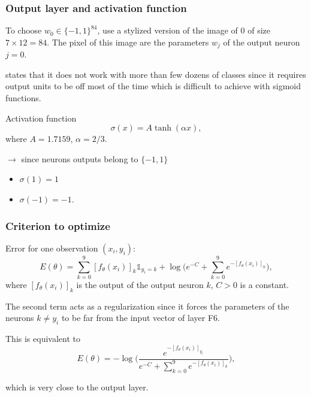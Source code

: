 \begin{frame}
	\frametitle{Output layer and activation function}
	
	To choose $w_0 \in \{-1, 1\}^{84}$, use a stylized version of the image of $0$ of size $7\times 12 =84$. The pixel of this image are the parameters $w_j$ of the output neuron $j=0$. 
	
	\medskip 
	
	\smallskip
	
	\cite{lecun1998gradient} states that it does not work with more than few dozens of classes since it requires output units to be off most of the time which is difficult to achieve with sigmoid functions. 
	
	\bigskip
	
	
	\begin{block}{Activation function}
	$$\sigma(x) = A \tanh (\alpha x),$$
	where $A = 1.7159$, $\alpha=2/3$. 
	\end{block}
	
	\smallskip 
	
	$\rightarrow$  since neurons outputs belong to $\{-1, 1\}$
	\begin{itemize}
		\item $\sigma(1) = 1$
		\item $\sigma(-1) = -1$.
	\end{itemize}
	
\end{frame}

\begin{frame}
	\frametitle{Criterion to optimize}
	
	Error for one observation $(x_i, y_i)$: 
	$$
	E (\theta) = \sum_{k=0}^{9}  [f_{\theta}(x_i)]_k \mathds{1}_{y_i = k}
	+ \log \Big(e^{-C} + \sum_{k=0}^9 e^{- [f_{\theta}(x_i)]_k} \Big),
	$$
	where $[f_{\theta}(x_i)]_k$ is the output of the output neuron $k$, $C>0$ is a constant. 
	
	\medskip 
	
	The second term acts as a regularization since it forces the parameters of the neurons $k\neq y_i$ to be far from the input vector of layer F6.
	
	\pause 
	\bigskip
	
	This is equivalent to 
	$$
	E (\theta) = - \log \Big( \frac{e^{-[f_{\theta}(x_i)]_{y_i}}}{e^{-C} + \sum_{k=0}^9 e^{- [f_{\theta}(x_i)]_k} }\Big),
	$$
	
	\smallskip
	which is very close to the  output layer. 
\end{frame}

